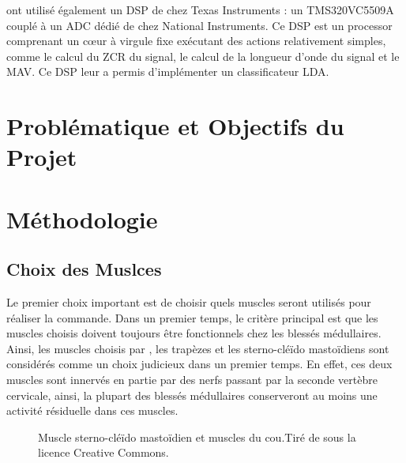 \documentclass[letterpaper, twoside, 12pt, memoire, creativecommons, hyperref]{thETS}
\begin{document}
\cite{Tenore2007} ont utilisé également un DSP de chez Texas Instruments : un TMS320VC5509A couplé à un ADC dédié de chez National Instruments. Ce DSP est un processor comprenant un cœur à virgule fixe exécutant des actions relativement simples, comme le calcul du ZCR du signal, le calcul de la longueur d’onde du signal et le MAV. Ce DSP leur a permis d'implémenter un classificateur LDA.


\chapter{Problématique et Objectifs du Projet}

\chapter{Méthodologie}\label{CHmethodo}

\section{Choix des Muslces}

Le premier choix important est de choisir quels muscles seront utilisés pour réaliser la commande. Dans un premier temps, le critère principal est que les muscles choisis doivent toujours être fonctionnels chez les blessés médullaires. Ainsi, les muscles choisis par \cite{Chang1996}, les trapèzes et les sterno-cléïdo mastoïdiens sont considérés comme un choix judicieux dans un premier temps. En effet, ces deux muscles sont innervés en partie par des nerfs passant par la seconde vertèbre cervicale, ainsi, la plupart des blessés médullaires conserveront au moins une activité résiduelle dans ces muscles. 

\begin{figure}
	\centering
	\caption{Muscle sterno-cléïdo mastoïdien et muscles du cou.Tiré de \cite{sternoWiki} sous la licence Creative Commons.}
	\label{fig:muscles}
\end{figure}
\end{document}
